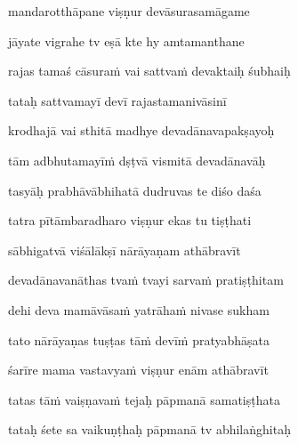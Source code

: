 mandarotthāpane viṣṇur devāsurasamāgame \veg\dontdisplaylinenum

jāyate vigrahe tv eṣā kte hy amtamanthane\thinspace{\dandab} \dontdisplaylinenum

rajas tamaś cāsura\.m vai sattva\.m devaktaiḥ śubhaiḥ \veg\dontdisplaylinenum

tataḥ sattvamayī devī rajastamanivāsinī\thinspace{\dandab} \dontdisplaylinenum

krodhajā vai sthitā madhye devadānavapakṣayoḥ \veg\dontdisplaylinenum

tām adbhutamayī\.m dṣṭvā vismitā devadānavāḥ\thinspace{\dandab} \dontdisplaylinenum

tasyāḥ prabhāvābhihatā dudruvas te diśo daśa \veg\dontdisplaylinenum

tatra pītāmbaradharo viṣṇur ekas tu tiṣṭhati\thinspace{\dandab} \dontdisplaylinenum

sābhigatvā viśālākṣī nārāyaṇam athābravīt \veg\dontdisplaylinenum

devadānavanāthas tva\.m tvayi sarva\.m pratiṣṭhitam\thinspace{\dandab} \dontdisplaylinenum

dehi deva mamāvāsa\.m yatrāha\.m nivase sukham \veg\dontdisplaylinenum

tato nārāyaṇas tuṣṭas tā\.m devī\.m pratyabhāṣata\thinspace{\dandab} \dontdisplaylinenum

śarīre mama vastavya\.m viṣṇur enām athābravīt \veg\dontdisplaylinenum

tatas tā\.m vaiṣṇava\.m tejaḥ pāpmanā samatiṣṭhata\thinspace{\dandab} \dontdisplaylinenum

tataḥ śete sa vaikuṇṭhaḥ pāpmanā tv abhilaṅghitaḥ \veg\dontdisplaylinenum

